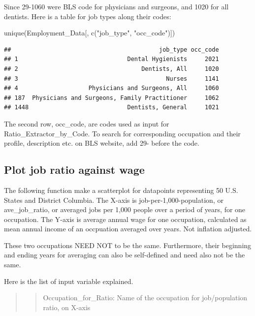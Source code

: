 \documentclass[
]{article}
\newenvironment{Shaded}{\begin{snugshade}}{\end{snugshade}}
\newcommand{\FunctionTok}[1]{\textcolor[rgb]{0.00,0.00,0.00}{#1}}
\newcommand{\NormalTok}[1]{#1}
\newcommand{\StringTok}[1]{\textcolor[rgb]{0.31,0.60,0.02}{#1}}
\begin{document}
Since 29-1060 were BLS code for physicians and surgeons, and 1020 for
all dentists. Here is a table for job types along their codes:

\begin{Shaded}
\begin{Highlighting}[]
\FunctionTok{unique}\NormalTok{(Employment\_Data[, }\FunctionTok{c}\NormalTok{(}\StringTok{"job\_type"}\NormalTok{, }\StringTok{"occ\_code"}\NormalTok{)])}
\end{Highlighting}
\end{Shaded}

\begin{verbatim}
##                                          job_type occ_code
## 1                               Dental Hygienists     2021
## 2                                   Dentists, All     1020
## 3                                          Nurses     1141
## 4                    Physicians and Surgeons, All     1060
## 187  Physicians and Surgeons, Family Practitioner     1062
## 1448                            Dentists, General     1021
\end{verbatim}

The second row, occ\_code, are codes used as input for
Ratio\_Extractor\_by\_Code. To search for corresponding occupation and
their profile, description etc. on BLS website, add 29- before the code.

\hypertarget{plot-job-ratio-against-wage}{%
\subsection{Plot job ratio against
wage}\label{plot-job-ratio-against-wage}}

The following function make a scatterplot for datapoints representing 50
U.S. States and District Columbia. The X-axis is
job-per-1,000-population, or ave\_job\_ratio, or averaged jobs per 1,000
people over a period of years, for one occupation. The Y-axis is average
annual wage for one occupation, calculated as mean annual income of an
occpuation averaged over years. Not inflation adjusted.

These two occupations NEED NOT to be the same. Furthermore, their
beginning and ending years for averaging can also be self-defined and
need also not be the same.

Here is the list of input variable explained.

\begin{quote}
\begin{quote}
Occupation\_for\_Ratio: Name of the occupation for job/population ratio,
on X-axis
\end{quote}
\end{quote}
\end{document}
